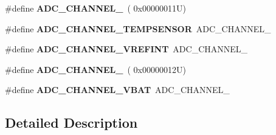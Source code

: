 \begin{DoxyCompactItemize}
\mbox{\label{group___a_d_c__channels_gaf7760a480f79c62d19260291f8afb6e1}} 
\#define {\bfseries A\+D\+C\+\_\+\+C\+H\+A\+N\+N\+E\+L\+\_}~( 0x00000011\+U)
\item 
\mbox{\label{group___a_d_c__channels_ga8f0da1e8fa8504c92a368f6eb8e229b3}} 
\#define {\bfseries A\+D\+C\+\_\+\+C\+H\+A\+N\+N\+E\+L\+\_\+\+T\+E\+M\+P\+S\+E\+N\+S\+OR}~A\+D\+C\+\_\+\+C\+H\+A\+N\+N\+E\+L\+\_
\item 
\mbox{\label{group___a_d_c__channels_ga2647a044275a295693e8fb01db3172f9}} 
\#define {\bfseries A\+D\+C\+\_\+\+C\+H\+A\+N\+N\+E\+L\+\_\+\+V\+R\+E\+F\+I\+NT}~A\+D\+C\+\_\+\+C\+H\+A\+N\+N\+E\+L\+\_
\item 
\mbox{\label{group___a_d_c__channels_ga30fc8e77b4c89d3ea0609cfbc7fc90fd}} 
\#define {\bfseries A\+D\+C\+\_\+\+C\+H\+A\+N\+N\+E\+L\+\_}~( 0x00000012\+U)
\item 
\mbox{\label{group___a_d_c__channels_ga60210f1e9305301dea9e42afedd9093f}} 
\#define {\bfseries A\+D\+C\+\_\+\+C\+H\+A\+N\+N\+E\+L\+\_\+\+V\+B\+AT}~A\+D\+C\+\_\+\+C\+H\+A\+N\+N\+E\+L\+\_
\end{DoxyCompactItemize}


\subsection{Detailed Description}
